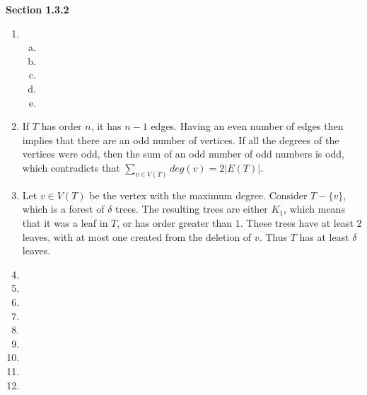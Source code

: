 \documentclass[11pt]{article}
\begin{document}
{\bfseries Section 1.3.2}

\begin{enumerate}[1]
    \item
        \begin{enumerate}[a)]
            \item 
            \item
            \item
            \item
            \item
        \end{enumerate}
    \item
        If $T$ has order $n$, it has $n - 1$ edges. Having an even number of edges 
        then implies that there are an odd number of vertices. If all the degrees 
        of the vertices were odd, then the sum of an odd number of odd numbers is
        odd, which contradicts that $\sum_{v \in V(T)} deg(v) = 2|E(T)|$.
    \item
        Let $v \in V(T)$ be the vertex with the maximum degree. Consider 
        $T - \{v\}$, which is a forest of $\delta$ trees. The resulting 
        trees are either $K_1$, which means that it was a leaf in $T$, or has 
        order greater than $1$. These trees have at least $2$ leaves, with at most 
        one created from the deletion of $v$. Thus $T$ has at least $\delta$ leaves.
    \item
        
    \item

    \item
    \item
    \item
    \item
    \item
    \item
    \item
\end{enumerate}
\end{document}
